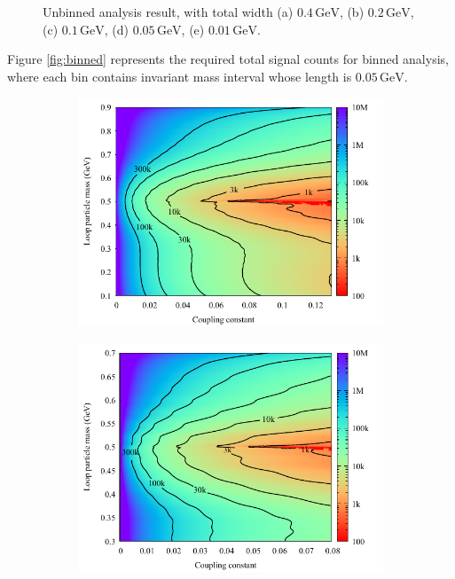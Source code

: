 \documentclass[10pt]{article}
\theoremstyle{definition}
\theoremstyle{remark}
\begin{document}
\begin{figure}[h]
\begin{subfigure}{0.3\textwidth}
		\caption{}
		\end{subfigure}
		\caption{Unbinned analysis result, with total width (a) $0.4\,\mathrm{GeV}$, (b) $0.2\,\mathrm{GeV}$, (c) $0.1\,\mathrm{GeV}$, (d) $0.05\,\mathrm{GeV}$, (e) $0.01\,\mathrm{GeV}$.}
		\label{fig:unbinned}
	\end{figure}
	
	Figure \ref{fig:binned} represents the required total signal counts for binned analysis, where each bin contains invariant mass interval whose length is $0.05\,\mathrm{GeV}$.
	
	\begin{figure}[h]
		\centering
		\begin{subfigure}{0.3\textwidth}
			\centering
			\includegraphics[width=\textwidth]{binned_0.4GeV.pdf}
			\caption{}
		\end{subfigure}
		\begin{subfigure}{0.3\textwidth}
			\centering
			\includegraphics[width=\textwidth]{binned_0.2GeV.pdf}

\end{subfigure}
\end{figure}
\end{document}
